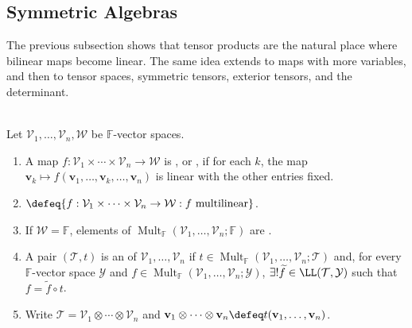 \subsection{Symmetric Algebras}


The previous subsection shows that tensor products are the natural place where bilinear maps become linear. The same idea extends to maps with more variables, and then to tensor spaces, symmetric tensors, exterior tensors, and the determinant.

\begin{definition} \label{def:multilinear-map}\label{def:iterated-tensor-product-universal-property} \\
Let $\mathcal{V}_1,\ldots,\mathcal{V}_n,\mathcal{W}$ be $\mathbb{F}$-vector spaces.
\begin{enumerate}[label=(\roman*)]
\setlength{\itemsep}{0pt}
\item A map $f:\mathcal{V}_1\times\cdots\times\mathcal{V}_n\to\mathcal{W}$ is , or , if for each $k$, the map $\mathbf{v}_k\mapsto f(\mathbf{v}_1,\ldots,\mathbf{v}_k,\ldots,\mathbf{v}_n)$ is linear with the other entries fixed.
\item {}$\defeq\{f:\mathcal{V}_1\times\cdots\times\mathcal{V}_n\to\mathcal{W}:f\text{ multilinear}\}$.
\item If $\mathcal{W}=\mathbb{F}$, elements of $\operatorname{Mult}_{\mathbb{F}}(\mathcal{V}_1,\ldots,\mathcal{V}_n;\mathbb{F})$ are .
\item A pair $(\mathcal{T},t)$ is an  of $\mathcal{V}_1,\ldots,\mathcal{V}_n$ if $t\in\operatorname{Mult}_{\mathbb{F}}(\mathcal{V}_1,\ldots,\mathcal{V}_n;\mathcal{T})$ and, for every $\mathbb{F}$-vector space $\mathcal{Y}$ and $f\in\operatorname{Mult}_{\mathbb{F}}(\mathcal{V}_1,\ldots,\mathcal{V}_n;\mathcal{Y})$, $\exists!\widetilde{f}\in\LL(\mathcal{T},\mathcal{Y})$ such that $f=\widetilde{f}\circ t$.
\item Write $\mathcal{T}=\mathcal{V}_1\otimes\cdots\otimes\mathcal{V}_n$ and $\mathbf{v}_1\otimes\cdots\otimes\mathbf{v}_n\defeq t(\mathbf{v}_1,\ldots,\mathbf{v}_n)$.
\end{enumerate}
\end{definition}


